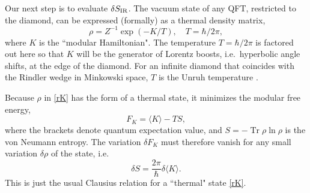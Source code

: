 \documentclass[aps,prd,twocolumn,showpacs,groupedaddress,nofootinbib,longbibliography]{revtex4-1}
\DeclareMathOperator{\Tr}{Tr}
\def\beq{\begin{equation}}
\def\eeq{\end{equation}}
\def\la{\langle}
\def\ra{\rangle}
\def\d{\delta}\def\D{\Delta}
\def\r{\rho}
\begin{document}





Our next step is to evaluate $\d S_{\rm IR}$.
The vacuum state of any QFT, restricted to the diamond, can be expressed (formally) as a
thermal density matrix, 
%
\beq\label{rK}
\r = Z^{-1}\exp(-K/T),\quad T=\hbar/2\pi,
\eeq
%
where $K$ is the ``modular Hamiltonian".  
The temperature $T=\hbar/2\pi$ is factored out here so that $K$ will be the 
generator of Lorentz boosts, i.e.\ hyperbolic angle shifts, at the edge of the diamond. 
For an infinite diamond that coincides with the Rindler wedge in Minkowski space, 
$T$ is the Unruh temperature \cite{Unruh1976, Sewell1982}.



Because $\r$ in \eqref{rK} has the form of a thermal state, it minimizes the modular free energy, 
%
\beq\label{FK}
F_K =\la K\ra - TS,
\eeq
%
where  the brackets denote quantum expectation value, and $S=-\Tr \r\ln\r$ is the von Neumann entropy. 
The variation $\d F_K$ must therefore vanish for any small variation  $\d\r$ of the state, i.e.\  
%
\beq\label{dSK}
\d S = \frac{2\pi}{\hbar}\d \la K\ra.
\eeq
%
This is just the usual Clausius relation for a ``thermal" state \eqref{rK}.
\end{document}
